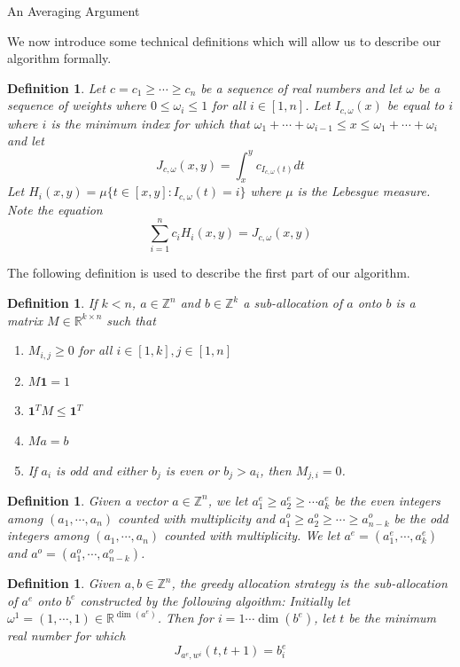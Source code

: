 \documentclass[11pt,a4paper]{article}
\newcounter{foo}
\newtheorem{definition}[foo]{Definition}
\begin{document}
\begin{section}{An Averaging Argument}
\medskip

We now introduce some technical definitions which will allow us to describe our algorithm formally.
\begin{definition} Let $c = c_1 \geq \cdots \geq c_n$ be a sequence of real numbers and let $\omega$ be a sequence of weights where $0 \leq \omega_i \leq 1$ for all $i \in [1, n]$. Let $I_{c, \omega}(x)$ be equal to $i$ where $i$ is the minimum index for which that $\omega_1 + \cdots + \omega_{i - 1} \leq x \leq \omega_1 + \cdots + \omega_i$ and let
\[
J_{c, \omega}(x, y) = \int_{x}^y c_{I_{c, \omega}(t)} dt
\]
Let $H_i(x, y) = \mu \{ t \in [x, y] : I_{c, \omega} (t) = i \}$ where $\mu$ is the Lebesgue measure. Note the equation
\[
\sum_{i = 1}^n c_i H_i(x, y) = J_{c, \omega} (x, y)
\]
\end{definition}
The following definition is used to describe the first part of our algorithm.
\begin{definition} If $k < n$, $a \in \mathbb{Z}^n$ and $b \in \mathbb{Z}^k$ a sub-allocation of $a$ onto $b$ is a matrix $M \in \mathbb{R}^{k \times n}$ such that
\begin{enumerate}
\item $M_{i, j} \geq 0$ for all $i \in [1, k], j \in [1, n]$
\item $M \boldsymbol{1} = 1$
\item $ \boldsymbol{1}^T M \leq \boldsymbol{1}^T$
\item $Ma = b$
\item If $a_i$ is odd and either $b_j$ is even or $b_j > a_i$, then $M_{j, i} = 0$.
\end{enumerate}
\end{definition}
\begin{definition} Given a vector $a \in \mathbb{Z}^n$, we let $a^e_1 \geq a^e_2 \geq \cdots a^e_k$ be the even integers among $(a_1, \cdots, a_n)$ counted with multiplicity and $a^o_1 \geq a^o_2 \geq \cdots \geq a^o_{n - k}$ be the odd integers among $(a_1, \cdots, a_n)$ counted with multiplicity. We let $a^e = (a^e_1, \cdots, a^e_k)$ and $a^o = (a^o_1, \cdots, a^o_{n - k} )$.
\end{definition}
\begin{definition} Given $a, b \in \mathbb{Z}^n$, the \textit{greedy allocation strategy} is the sub-allocation of $a^e$ onto $b^e$ constructed by the following algoithm: Initially let $\omega^1 = (1, \cdots, 1) \in \mathbb{R}^{\dim(a^e)}$. Then for $i = 1 \cdots \dim(b^e)$, let $t$ be the minimum real number for which
\[
J_{a^e, w^i} (t, t + 1) = b^e_i
\]
\end{definition}
\end{section}
\end{document}
